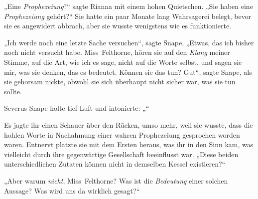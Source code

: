 „Eine \emph{Prophezeiung}?“ sagte Rianna mit einem hohen Quietschen.
„Sie haben eine \emph{Prophezeiung} gehört?“ Sie hatte ein paar Monate lang Wahrsagerei belegt, bevor sie es angewidert abbrach, aber sie wusste wenigstens wie es funktionierte.

„Ich werde noch eine letzte Sache versuchen“, sagte Snape.
„Etwas, das ich bisher noch nicht versucht habe. Miss~Felthorne, hören sie auf den \emph{Klang} meiner Stimme, auf die Art, wie ich es sage, nicht auf die Worte selbst, und sagen sie mir, was sie denken, das es bedeutet. Können sie das tun? Gut“, sagte Snape, als sie gehorsam nickte, obwohl sie sich überhaupt nicht sicher war, was sie tun sollte.

Severus Snape holte tief Luft und intonierte:
„“

Es jagte ihr einen Schauer über den Rücken, umso mehr, weil sie wusste, dass die hohlen Worte in Nachahmung einer wahren Prophezeiung gesprochen worden waren. Entnervt platzte sie mit dem Ersten heraus, was ihr in den Sinn kam, was vielleicht durch ihre gegenwärtige Gesellschaft beeinflusst war.
„Diese beiden unterschiedlichen Zutaten können nicht in demselben Kessel existieren?“

„Aber warum \emph{nicht}, Miss~Felthorne? Was ist die \emph{Bedeutung} einer solchen Aussage? Was wird uns da wirklich gesagt?“

